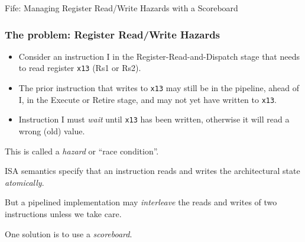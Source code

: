 \begin{frame}

\begin{center}
  {\LARGE Fife: Managing Register Read/Write Hazards with a Scoreboard}
\end{center}

\end{frame}


\begin{frame}[fragile]
\frametitle{The problem: Register Read/Write Hazards}

\footnotesize

\begin{itemize}

 \item Consider an instruction I in the Register-Read-and-Dispatch
       stage that needs to read register {\tt x13} (Rs1 or Rs2).

 \item The prior instruction that writes to {\tt x13} may still be in
       the pipeline, ahead of I, in the Execute or Retire stage, and
       may not yet have written to {\tt x13}.

 \item Instruction I must \emph{wait} until {\tt x13} has been
       written, otherwise it will read a wrong (old) value.

\end{itemize}

\vspace{2ex}

This is called a \emph{hazard} or ``race condition''.

\vspace{5ex}

ISA semantics specify that an instruction reads and writes the
architectural state \emph{atomically}.

\vspace{1ex}

But a pipelined implementation may \emph{interleave} the reads and
writes of two instructions unless we take care.

\vspace{5ex}

One solution is to use a \emph{scoreboard}.

\end{frame}


